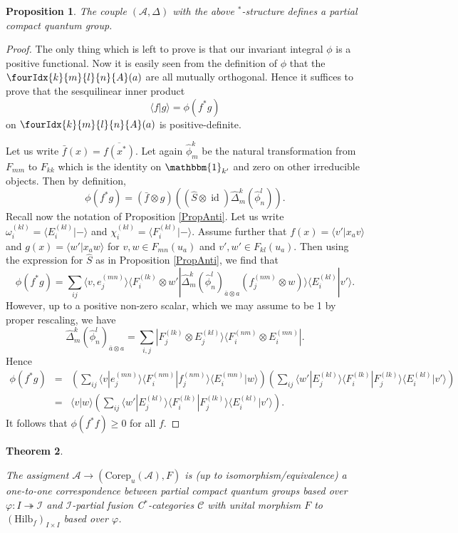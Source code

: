 \documentclass[10pt]{article}
\DeclareMathOperator{\id}{id}
\newcommand{\Corep}{\mathrm{Corep}}
\newcommand{\CatCC}{\mathscr{C}}
\newcommand{\Hilb}{\mathrm{Hilb}}
\newcommand{\Unitb}{\mathbbm{1}}
\newcommand{\Gr}[5]{\fourIdx{#2}{#4}{#3}{#5}{#1}}%
\newtheorem{Theorem}{Theorem}[section]
\newtheorem{Prop}[Theorem]{Proposition}
\theoremstyle{definition}
\numberwithin{equation}{section}
\begin{document}
\begin{Prop} The couple $(\mathscr{A},\Delta)$ with the above $^*$-structure defines a partial compact quantum group.
\end{Prop}
\begin{proof} The only thing which is left to prove is that our invariant integral $\phi$ is a positive functional. Now it is easily seen from the definition of $\phi$ that the $\Gr{A}{k}{l}{m}{n}(a)$ are all mutually orthogonal. Hence it suffices to prove that the sesquilinear inner product \[\langle f| g\rangle = \phi(f^*g)\] on $\Gr{A}{k}{l}{m}{n}(a)$ is positive-definite. 

Let us write $\bar{f}(x) = \overline{f(x^*)}$. Let again $\hat{\phi}^k_m$ be the natural transformation from $F_{mm}$ to $F_{kk}$ which is the identity on $\Unitb_{k'}$ and zero on other irreducible objects. Then by definition, \[\phi(f^*g) = (\bar{f}\otimes g)((\hat{S}\otimes \id)\hat{\Delta}^k_m(\hat{\phi}^l_n)).\] Recall now the notation of Proposition \ref{PropAnti}. Let us write $\omega_i^{(kl)} = \langle E_i^{(kl)}| -\rangle$ and $\chi_i^{(kl)} = \langle F_i^{(kl)}| -\rangle$. Assume further that $f(x) = \langle v'| x_a v\rangle$ and $g(x) = \langle w' | x_aw\rangle$ for $v,w\in F_{mn}(u_a)$ and $v',w'\in F_{kl}(u_a)$. Then using the expression for $\hat{S}$ as in Proposition \ref{PropAnti}, we find that \[\phi(f^*g) = \sum_{ij} \langle v,e_j^{(mn)}\rangle\langle F_i^{(lk)}\otimes w' | \hat{\Delta}_m^k(\hat{\phi}^{l}_n)_{\bar{a}\otimes a} (f_j^{(nm)}\otimes w)\rangle \langle E_i^{(kl)}| v'\rangle .\] However, up to a positive non-zero scalar, which we may assume to be 1 by proper rescaling, we have \[\hat{\Delta}^k_m(\hat{\phi}^l_n)_{\bar{a}\otimes a} = \sum_{i,j} | F_j^{(lk)} \otimes E_j^{(kl)}\rangle \langle F_i^{(nm)}\otimes E_i^{(mn)}|.\] Hence \begin{eqnarray*} \phi(f^*g) &=&\left(\sum_{ij}\langle v| e_j^{(mn)}\rangle \langle F_i^{(nm)}| f_j^{(nm)}\rangle\langle E_i^{(mn)}| w\rangle \right)  \left(\sum_{ij}  \langle w' | E_j^{(kl)}\rangle \langle F_i^{(lk)}| F_j^{(lk)}\rangle\langle E_i^{(kl)}| v'\rangle\right)\\ &=& \langle v| w\rangle  \left(\sum_{ij}  \langle w'| E_j^{(kl)}\rangle \langle F_i^{(lk)}| F_j^{(lk)}\rangle\langle E_i^{(kl)}| v'\rangle\right).
\end{eqnarray*} It follows that $\phi(f^*f)\geq 0$ for all $f$.

\end{proof} 

\begin{Theorem} \label{TheoTKPCQG}

The assigment $\mathscr{A}\rightarrow (\Corep_u(\mathscr{A}),F)$ is (up to isomorphism/equivalence) a one-to-one correspondence between partial compact quantum groups based over $\varphi:I\twoheadrightarrow \mathscr{I}$ and $\mathscr{I}$-partial fusion C$^*$-categories $\CatCC$ with unital morphism $F$ to $(\Hilb_f)_{I\times I}$ based over $\varphi$. 
\end{Theorem} 
\end{document}

